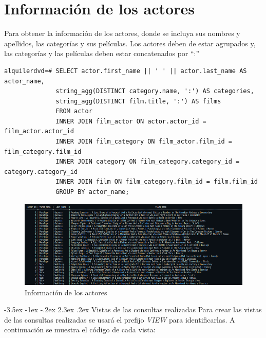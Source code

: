 \documentclass{report}
\makeatletter
\renewcommand\chapter{\@startsection{chapter}{0}{\z@}%
    {-3.5ex \@plus -1ex \@minus -.2ex}%
    {2.3ex \@plus.2ex}%
    {\normalfont\Large\bfseries}}
\makeatother
\begin{document}
\section{Información de los actores}
Para obtener la información de los actores, donde se incluya sus nombres y
apellidos, las categorías y sus películas. Los actores deben de estar
agrupados y, las categorías y las películas deben estar concatenados por
“:”
\begin{verbatim}
alquilerdvd=# SELECT actor.first_name || ' ' || actor.last_name AS actor_name,
              string_agg(DISTINCT category.name, ':') AS categories,
              string_agg(DISTINCT film.title, ':') AS films
              FROM actor
              INNER JOIN film_actor ON actor.actor_id = film_actor.actor_id
              INNER JOIN film_category ON film_actor.film_id = film_category.film_id
              INNER JOIN category ON film_category.category_id = category.category_id
              INNER JOIN film ON film_category.film_id = film.film_id
              GROUP BY actor_name;
\end{verbatim}
\begin{figure}[H]
  \centering
  \includegraphics[scale=0.60]{img/querie_d.png}
  \caption{Información de los actores}
  \label{fig:información de los actores}
\end{figure}

\cleardoublepage

\chapter{Vistas de las consultas realizadas}
Para crear las vistas de las consultas realizadas se usará el prefijo \emph{VIEW} para identificarlas. A continuación se muestra el código de cada vista:

\end{document}
